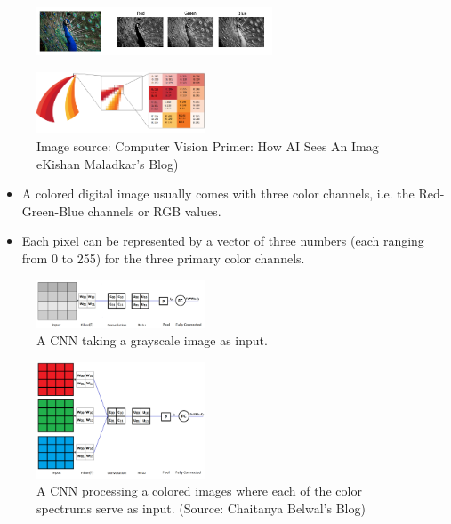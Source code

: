 \begin{vbframe}

 \begin{figure}
    \centering
    \includegraphics[width=7cm]{figure/RGB.jpeg}
  \end{figure}

 \begin{figure}
    \centering
    \includegraphics[width=5cm]{figure/RGB-1.png}
    \caption{\tiny Image source: Computer Vision Primer: How AI Sees An Imag eKishan Maladkar's Blog)}
  \end{figure}

\begin{itemize}
       \item A colored digital image usually comes with three color channels, i.e. the Red-Green-Blue channels or RGB values.   
        \item Each pixel can be represented by a vector of three numbers (each ranging from 0 to 255) for the three primary color channels.
      
\end{itemize}
 \begin{figure}
    \centering
    \includegraphics[width=5cm]{figure/1channel.png}
    \caption{\tiny A CNN taking a grayscale image as input.}
  \end{figure}


 \begin{figure}
    \centering
    \includegraphics[width=5cm]{figure/3channel.png}
    \caption{\tiny A CNN processing a colored images where each of the color spectrums serve as input. (Source: Chaitanya Belwal's Blog)}
  \end{figure}
  
  
\end{vbframe}
